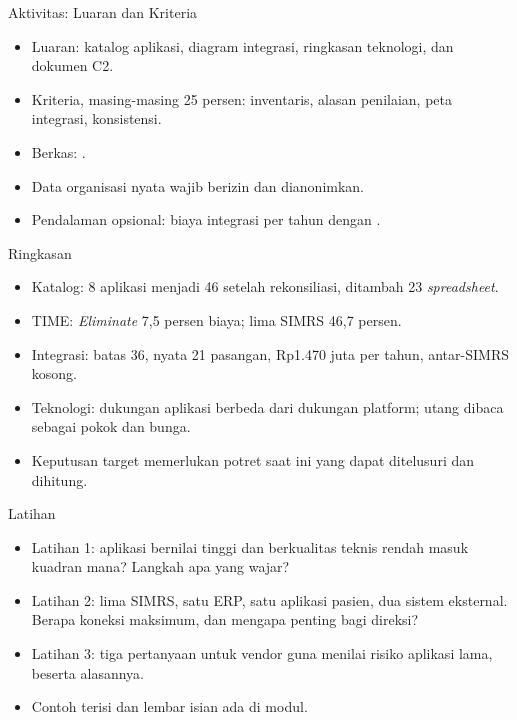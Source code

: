 \documentclass[aspectratio=169, table, 12pt]{beamer}
\begin{document}
\begin{frame}{{\Large Aktivitas: Luaran dan Kriteria}}
  \vspace{10pt}
  \begin{itemize}
    \item Luaran: katalog aplikasi, diagram integrasi, ringkasan teknologi, dan dokumen C2.
    \item Kriteria, masing-masing 25 persen: inventaris, alasan penilaian, peta integrasi, konsistensi.
    \item Berkas: .
    \item Data organisasi nyata wajib berizin dan dianonimkan.
    \item Pendalaman opsional: biaya integrasi per tahun dengan .
  \end{itemize}
\end{frame}

\begin{frame}{{\Large Ringkasan}}
  \vspace{10pt}
  \begin{itemize}
    \item Katalog: 8 aplikasi menjadi 46 setelah rekonsiliasi, ditambah 23 \textit{spreadsheet}.
    \item TIME: \textit{Eliminate} 7,5 persen biaya; lima SIMRS 46,7 persen.
    \item Integrasi: batas 36, nyata 21 pasangan, Rp1.470 juta per tahun, antar-SIMRS kosong.
    \item Teknologi: dukungan aplikasi berbeda dari dukungan platform; utang dibaca sebagai pokok dan bunga.
    \item Keputusan target memerlukan potret saat ini yang dapat ditelusuri dan dihitung.
  \end{itemize}
\end{frame}

\begin{frame}{{\Large Latihan}}
  \vspace{10pt}
  \begin{itemize}
    \item Latihan 1: aplikasi bernilai tinggi dan berkualitas teknis rendah masuk kuadran mana? Langkah apa yang wajar?
    \item Latihan 2: lima SIMRS, satu ERP, satu aplikasi pasien, dua sistem eksternal. Berapa koneksi maksimum, dan mengapa
          penting bagi direksi?
    \item Latihan 3: tiga pertanyaan untuk vendor guna menilai risiko aplikasi lama, beserta alasannya.
    \item Contoh terisi dan lembar isian ada di modul.
  \end{itemize}
\end{frame}
\end{document}
